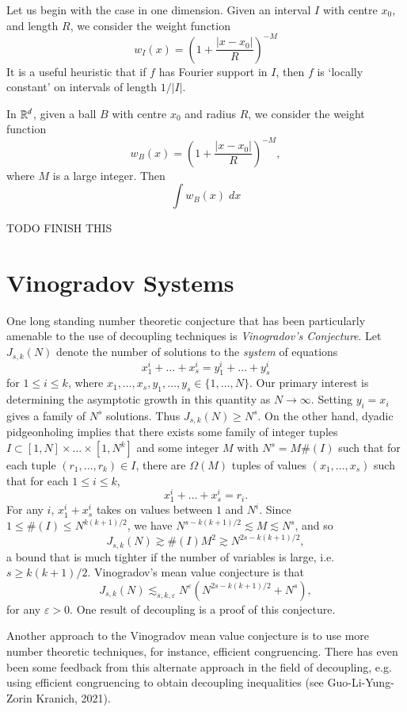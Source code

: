 Let us begin with the case in one dimension. Given an interval $I$ with centre $x_0$, and length $R$, we consider the weight function
%
\[ w_I(x) = \left( 1 + \frac{|x - x_0|}{R} \right)^{-M} \]
%
It is a useful heuristic that if $f$ has Fourier support in $I$, then $f$ is `locally constant' on intervals of length $1/|I|$.

In $\operatorname{\mathbb{R}}^d$, given a ball $B$ with centre $x_0$ and radius $R$, we consider the weight function
%
\[ w_B(x) = \left( 1 + \frac{|x - x_0|}{R} \right)^{-M}, \]
%
where $M$ is a large integer. Then
%
\[ \int w_B(x)\; dx \]

TODO FINISH THIS

\section{Vinogradov Systems}

One long standing number theoretic conjecture that has been particularly amenable to the use of decoupling techniques is \emph{Vinogradov's Conjecture}. Let $J_{s,k}(N)$ denote the number of solutions to the \emph{system} of equations
%
\[ x_1^i + \dots + x_s^i = y_1^i + \dots + y_s^i \]
%
for $1 \leq i \leq k$, where $x_1,\dots,x_s,y_1,\dots,y_s \in \{ 1, \dots, N \}$. Our primary interest is determining the asymptotic growth in this quantity as $N \to \infty$. Setting $y_i = x_i$ gives a family of $N^s$ solutions. Thus $J_{s,k}(N) \geq N^s$. On the other hand, dyadic pidgeonholing implies that there exists some family of integer tuples $I \subset [1,N] \times \dots \times [1,N^k]$ and some integer $M$ with $N^s = M \#(I)$ such that for each tuple $(r_1,\dots,r_k) \in I$, there are $\Omega(M)$ tuples of values $(x_1,\dots,x_s)$ such that for each $1 \leq i \leq k$,
%
\[ x_1^i + \dots + x_s^i = r_i. \]
%
For any $i$, $x_1^i + x_s^i$ takes on values between $1$ and $N^i$. Since $1 \leq \#(I) \leq N^{k(k+1)/2}$, we have $N^{s - k(k+1)/2} \lesssim M \lesssim N^s$, and so
%
\[ J_{s,k}(N) \gtrsim \#(I) M^2 \gtrsim N^{2s - k(k+1)/2}, \]
%
a bound that is much tighter if the number of variables is large, i.e. $s \geq k(k+1)/2$. Vinogradov's mean value conjecture is that
%
\[ J_{s,k}(N) \lesssim_{s,k,\varepsilon} N^\varepsilon ( N^{2s-k(k+1)/2} + N^s ), \]
%
for any $\varepsilon > 0$. One result of decoupling is a proof of this conjecture.

\begin{remark}
  Another approach to the Vinogradov mean value conjecture is to use more number theoretic techniques, for instance, efficient congruencing. There has even been some feedback from this alternate approach in the field of decoupling, e.g. using efficient congruencing to obtain decoupling inequalities (see Guo-Li-Yung-Zorin Kranich, 2021).
\end{remark}

